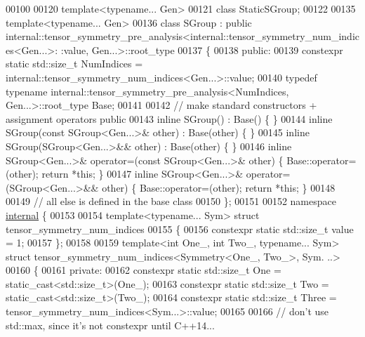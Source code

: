 \begin{DoxyCode}
00100 
00120 \textcolor{keyword}{template}<\textcolor{keyword}{typename}... Gen>
00121 \textcolor{keyword}{class }StaticSGroup;
00122 
00135 \textcolor{keyword}{template}<\textcolor{keyword}{typename}... Gen>
00136 \textcolor{keyword}{class }SGroup : \textcolor{keyword}{public} internal::tensor\_symmetry\_pre\_analysis<internal::tensor\_symmetry\_num\_indices<Gen...>:
      :value, Gen...>::root\_type
00137 \{
00138   \textcolor{keyword}{public}:
00139     constexpr \textcolor{keyword}{static} std::size\_t NumIndices = internal::tensor\_symmetry\_num\_indices<Gen...>::value;
00140     \textcolor{keyword}{typedef} \textcolor{keyword}{typename} internal::tensor\_symmetry\_pre\_analysis<NumIndices, Gen...>::root\_type Base;
00141 
00142     \textcolor{comment}{// make standard constructors + assignment operators public}
00143     \textcolor{keyword}{inline} SGroup() : Base() \{ \}
00144     \textcolor{keyword}{inline} SGroup(\textcolor{keyword}{const} SGroup<Gen...>& other) : Base(other) \{ \}
00145     \textcolor{keyword}{inline} SGroup(SGroup<Gen...>&& other) : Base(other) \{ \}
00146     \textcolor{keyword}{inline} SGroup<Gen...>& operator=(\textcolor{keyword}{const} SGroup<Gen...>& other) \{ Base::operator=(other); \textcolor{keywordflow}{return} *\textcolor{keyword}{this}; \}
00147     \textcolor{keyword}{inline} SGroup<Gen...>& operator=(SGroup<Gen...>&& other) \{ Base::operator=(other); \textcolor{keywordflow}{return} *\textcolor{keyword}{this}; \}
00148 
00149     \textcolor{comment}{// all else is defined in the base class}
00150 \};
00151 
00152 \textcolor{keyword}{namespace }\hyperlink{namespaceinternal}{internal} \{
00153 
00154 \textcolor{keyword}{template}<\textcolor{keyword}{typename}... Sym> \textcolor{keyword}{struct }tensor\_symmetry\_num\_indices
00155 \{
00156   constexpr \textcolor{keyword}{static} std::size\_t value = 1;
00157 \};
00158 
00159 \textcolor{keyword}{template}<\textcolor{keywordtype}{int} One\_, \textcolor{keywordtype}{int} Two\_, \textcolor{keyword}{typename}... Sym> \textcolor{keyword}{struct }tensor\_symmetry\_num\_indices<Symmetry<One\_, Two\_>, Sym.
      ..>
00160 \{
00161 \textcolor{keyword}{private}:
00162   constexpr \textcolor{keyword}{static} std::size\_t One = \textcolor{keyword}{static\_cast<}std::size\_t\textcolor{keyword}{>}(One\_);
00163   constexpr \textcolor{keyword}{static} std::size\_t Two = \textcolor{keyword}{static\_cast<}std::size\_t\textcolor{keyword}{>}(Two\_);
00164   constexpr \textcolor{keyword}{static} std::size\_t Three = tensor\_symmetry\_num\_indices<Sym...>::value;
00165 
00166   \textcolor{comment}{// don't use std::max, since it's not constexpr until C++14...}

\end{DoxyCode}
